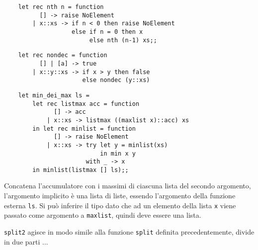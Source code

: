 \documentclass{article}
\numberwithin{equation}{subsection}
\begin{document}
\begin{verbatim}
    let rec nth n = function
          [] -> raise NoElement
        | x::xs -> if n < 0 then raise NoElement
                   else if n = 0 then x
                        else nth (n-1) xs;;
\end{verbatim}


\begin{verbatim}
    let rec nondec = function
          [] | [a] -> true
        | x::y::xs -> if x > y then false
                      else nondec (y::xs)
\end{verbatim}



\begin{verbatim}
    let min_dei_max ls = 
        let rec listmax acc = function
              [] -> acc
            | x::xs -> listmax ((maxlist x)::acc) xs
        in let rec minlist = function
              [] -> raise NoElement
            | x::xs -> try let y = minlist(xs)
                           in min x y
                       with _ -> x
        in minlist(listmax [] ls);;
\end{verbatim}

Concatena l'accumulatore con i massimi di ciascuna lista del secondo argomento, l'argomento implicito è una lista di liste, essendo l'argomento della funzione esterna \verb|ls|. Si può inferire il tipo dato che ad un elemento della lista \verb|x| viene passato come argomento a \verb|maxlist|, quindi deve essere una lista. 



\verb|split2| agisce in modo simile alla funzione \verb|split| definita precedentemente, divide in due parti ...

\clearpage
\end{document}
